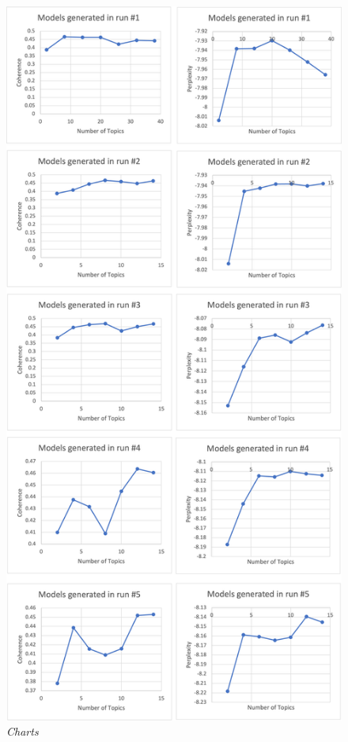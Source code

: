 \documentclass[twoside,11pt,a4paper]{article}
\begin{document}
\begin{figure}[h]
\centering
\includegraphics[scale=0.5]{charts_models.png}
\caption{\textit{Charts}}
\label{fig:charts_models}
\end{figure}
\end{document}

